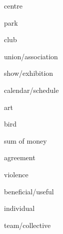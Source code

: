 \documentclass[avery5371,grid,frame]{flashcards}
\begin{document}
\begin{flashcard}{\LARGE centre}
\LARGE {}
\end{flashcard}
\begin{flashcard}{\LARGE park}
\LARGE {}
\end{flashcard}
\begin{flashcard}{\LARGE club}
\LARGE {}
\end{flashcard}
\begin{flashcard}{\LARGE union/association}
\LARGE {}
\end{flashcard}
\begin{flashcard}{\LARGE show/exhibition}
\LARGE {}
\end{flashcard}
\begin{flashcard}{\LARGE calendar/schedule}
\LARGE {}
\end{flashcard}
\begin{flashcard}{\LARGE art}
\LARGE {}
\end{flashcard}
\begin{flashcard}{\LARGE bird}
\LARGE {}
\end{flashcard}
\begin{flashcard}{\LARGE sum of money}
\LARGE {}
\end{flashcard}
\begin{flashcard}{\LARGE agreement}
\LARGE {}
\end{flashcard}
\begin{flashcard}{\LARGE violence}
\LARGE {}
\end{flashcard}
\begin{flashcard}{\LARGE beneficial/useful}
\LARGE {}
\end{flashcard}
\begin{flashcard}{\LARGE individual}
\LARGE {}
\end{flashcard}
\begin{flashcard}{\LARGE team/collective}
\LARGE {}
\end{flashcard}
\end{document}
